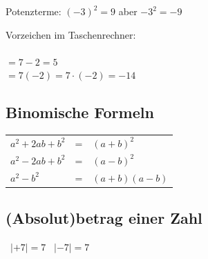 \begin{multicols}{2}
Potenzterme: $(-3)^2 = 9$ aber $-3^2 = -9$

\forceCB{}%
\keinHeaderUndKeinFooter{}

Vorzeichen im Taschenrechner:\\
\vspace{3mm}\\
$=7-2= 5$\\
$=7(-2)=7\cdot{}(-2)= -14$








\subsection*{Binomische Formeln}
\begin{tabular}{lcl}
  $a^2 + 2ab + b^2$  & =  &  $(a+b)^2$\\
  $a^2 - 2ab + b^2$  & =  &  $(a-b)^2$\\
  $a^2 - b^2$        & =  &  $(a+b)(a-b)$
\end{tabular} 


\subsection*{(Absolut)betrag einer Zahl}%
\hfill\, $|+7| = 7$ \hfill\, $|-7| = 7$ \hfill\, %


\end{multicols}
